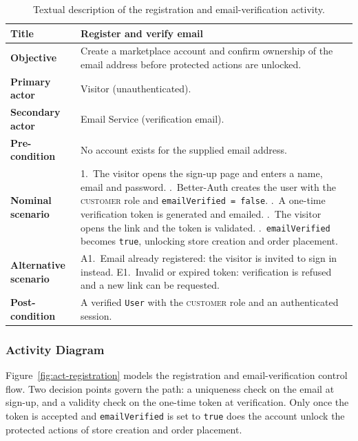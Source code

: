\begin{table}[H]
  \centering
  \caption{Textual description of the registration and email-verification activity.}
  \label{tab:act-registration-desc}
  \renewcommand{\arraystretch}{1.3}
  \begin{tabularx}{\textwidth}{|>{\bfseries}p{3.2cm}|X|}
    \hline
    Title & Register and verify email \\ \hline
    Objective & Create a marketplace account and confirm ownership of the email address before protected actions are unlocked. \\ \hline
    Primary actor & Visitor (unauthenticated). \\ \hline
    Secondary actor & Email Service (verification email). \\ \hline
    Pre-condition & No account exists for the supplied email address. \\ \hline
    Nominal scenario & 1.~The visitor opens the sign-up page and enters a name, email and password. \newline 2.~Better-Auth creates the user with the \textsc{customer} role and \texttt{emailVerified = false}. \newline 3.~A one-time verification token is generated and emailed. \newline 4.~The visitor opens the link and the token is validated. \newline 5.~\texttt{emailVerified} becomes \texttt{true}, unlocking store creation and order placement. \\ \hline
    Alternative scenario & A1.~Email already registered: the visitor is invited to sign in instead. \newline E1.~Invalid or expired token: verification is refused and a new link can be requested. \\ \hline
    Post-condition & A verified \texttt{User} with the \textsc{customer} role and an authenticated session. \\ \hline
  \end{tabularx}
\end{table}

\subsubsection{Activity Diagram}

Figure~\ref{fig:act-registration} models the registration and
email-verification control flow. Two decision points govern the path: a
uniqueness check on the email at sign-up, and a validity check on the
one-time token at verification. Only once the token is accepted and
\texttt{emailVerified} is set to \texttt{true} does the account unlock
the protected actions of store creation and order placement.

